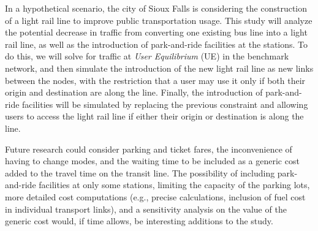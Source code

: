 In a hypothetical scenario, the city of Sioux Falls is considering the construction of a light rail line to improve public transportation usage. This study will analyze the potential decrease in traffic from converting one existing bus line into a light rail line, as well as the introduction of park-and-ride facilities at the stations. To do this, we will solve for traffic at \textit{User Equilibrium} (UE) in the benchmark network, and then simulate the introduction of the new light rail line as new links between the nodes, with the restriction that a user may use it only if both their origin and destination are along the line. Finally, the introduction of park-and-ride facilities will be simulated by replacing the previous constraint and allowing users to access the light rail line if either their origin or destination is along the line.

Future research could consider parking and ticket fares, the inconvenience of having to change modes, and the waiting time to be included as a generic cost added to the travel time on the transit line. The possibility of including park-and-ride facilities at only some stations, limiting the capacity of the parking lots, more detailed cost computations (e.g., precise calculations, inclusion of fuel cost in individual transport links), and a sensitivity analysis on the value of the generic cost would, if time allows, be interesting additions to the study.
